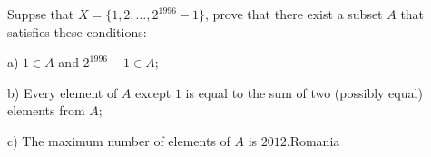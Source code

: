 Suppse that $X=\{1,2, \ldots, 2^{1996}-1\}$,  prove that there exist a subset $A$ that satisfies these conditions:

a) $1\in A$ and $2^{1996}-1\in A$;

b) Every element of $A$ except $1$ is equal to the sum of two (possibly equal) elements from $A$;

c) The maximum number of elements of $A$ is $2012$.Romania